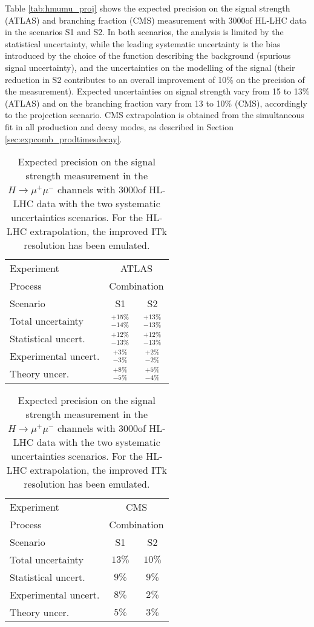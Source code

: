 Table \ref{tab:hmumu_proj} shows the expected precision on the signal strength (ATLAS) and branching fraction (CMS) measurement with 3000\fbinv of HL-LHC data in the scenarios S1 and S2.
In both scenarios, the analysis is limited by the statistical uncertainty, while the leading systematic uncertainty is the bias introduced by the choice of the function describing the background (spurious signal uncertainty), and the uncertainties on the modelling of the signal (their reduction in S2 contributes to an overall improvement of 10\% on the precision of the measurement). Expected uncertainties on signal strength vary from 15 to 13\% (ATLAS) and on the branching fraction vary from 13 to 10\% (CMS), accordingly to the projection scenario. CMS extrapolation is obtained from the simultaneous fit in all production and decay modes, as described in Section \ref{sec:expcomb_prodtimesdecay}.

\begin{table}[th!]
\begin{center}
\renewcommand{\arraystretch}{1.5}
{
\caption{Expected precision on the signal strength measurement in the $H\to\mu^{+}\mu^{-}$ channels with 3000\fbinv of HL-LHC data with the two systematic uncertainties scenarios. For the HL-LHC extrapolation, the improved ITk resolution has been emulated. }
\label{tab:hmumu_proj}
\begin{tabular}{l | c c}
\hline\hline
Experiment & \multicolumn{2}{c}{ATLAS}\\
Process & \multicolumn{2}{c}{Combination}\\ 
\hline
Scenario  & S1 & S2  \\
Total uncertainty   & $^{+15\%}_{-14\%}$  & $^{+13\%}_{-13\%}$  \\
\hline
Statistical uncert. & $^{+12\%}_{-13\%}$  & $^{+12\%}_{-13\%}$  \\
Experimental uncert. & $^{+3\%}_{-3\%}$  & $^{+2\%}_{-2\%}$  \\
Theory uncer. & $^{+8\%}_{-5\%}$ & $^{+5\%}_{-4\%}$  \\
\hline\hline
\end{tabular}

\vspace{5mm}

\label{tab:hmumu_proj_cms}
\begin{tabular}{l | c c}
\hline\hline
Experiment & \multicolumn{2}{c}{CMS}\\
Process & \multicolumn{2}{c}{Combination}\\ 
\hline
Scenario  & S1 & S2  \\
Total uncertainty   & $13\%$  & $10\%$  \\
\hline
Statistical uncert. & $9\%$  & $9\%$  \\
Experimental uncert. & $8\%$  & $2\%$  \\
Theory uncer. & $5\%$  & $3\%$  \\
\hline\hline
\end{tabular}


} %
\end{center}
\end{table}


